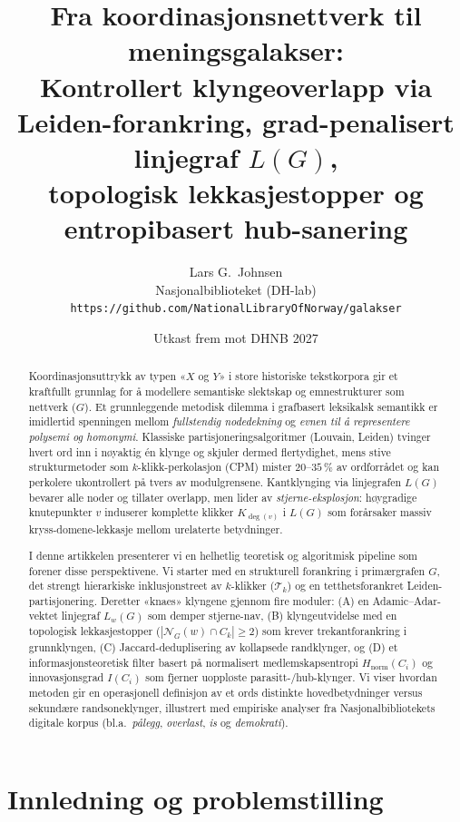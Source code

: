 \documentclass[11pt,a4paper]{article}
\title{\textbf{Fra koordinasjonsnettverk til meningsgalakser:\\
Kontrollert klyngeoverlapp via Leiden-forankring, grad-penalisert linjegraf $L(G)$,\\
topologisk lekkasjestopper og entropibasert hub-sanering}}
\author{Lars G.\ Johnsen \\
Nasjonalbiblioteket (DH-lab) \\
\texttt{https://github.com/NationalLibraryOfNorway/galakser}}
\date{Utkast frem mot DHNB 2027}
\begin{document}
\maketitle

\begin{abstract}
Koordinasjonsuttrykk av typen «$X$ og $Y$» i store historiske tekstkorpora gir et kraftfullt grunnlag for å modellere semantiske slektskap og emnestrukturer som nettverk ($G$). Et grunnleggende metodisk dilemma i grafbasert leksikalsk semantikk er imidlertid spenningen mellom \emph{fullstendig nodedekning} og \emph{evnen til å representere polysemi og homonymi}. Klassiske partisjoneringsalgoritmer (Louvain, Leiden) tvinger hvert ord inn i nøyaktig én klynge og skjuler dermed flertydighet, mens stive strukturmetoder som $k$-klikk-perkolasjon (CPM) mister $20\text{--}35\,\%$ av ordforrådet og kan perkolere ukontrollert på tvers av modulgrensene. Kantklynging via linjegrafen $L(G)$ bevarer alle noder og tillater overlapp, men lider av \emph{stjerne-eksplosjon}: høygradige knutepunkter $v$ induserer komplette klikker $K_{\deg(v)}$ i $L(G)$ som forårsaker massiv kryss-domene-lekkasje mellom urelaterte betydninger.

I denne artikkelen presenterer vi en helhetlig teoretisk og algoritmisk pipeline som forener disse perspektivene. Vi starter med en strukturell forankring i primærgrafen $G$, det strengt hierarkiske inklusjonstreet av $k$-klikker ($\mathcal{T}_k$) og en tetthetsforankret Leiden-partisjonering. Deretter «knaes» klyngene gjennom fire moduler: (A) en Adamic--Adar-vektet linjegraf $L_w(G)$ som demper stjerne-nav, (B) klyngeutvidelse med en topologisk lekkasjestopper ($|\mathcal{N}_G(w) \cap C_k| \ge 2$) som krever trekantforankring i grunnklyngen, (C) Jaccard-deduplisering av kollapsede randklynger, og (D) et informasjonsteoretisk filter basert på normalisert medlemskapsentropi $H_{\text{norm}}(C_i)$ og innovasjonsgrad $I(C_i)$ som fjerner uoppløste parasitt-/hub-klynger. Vi viser hvordan metoden gir en operasjonell definisjon av et ords distinkte hovedbetydninger versus sekundære randsoneklynger, illustrert med empiriske analyser fra Nasjonalbibliotekets digitale korpus (bl.a.\ \emph{pålegg}, \emph{overlast}, \emph{is} og \emph{demokrati}).
\end{abstract}

\tableofcontents
\newpage

\section{Innledning og problemstilling}
\end{document}
